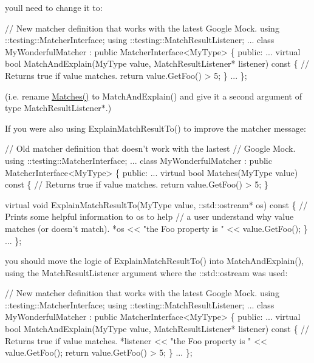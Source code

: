 you\textquotesingle{}ll need to change it to\+: 
\begin{DoxyCode}
// New matcher definition that works with the latest Google Mock.
using ::testing::MatcherInterface;
using ::testing::MatchResultListener;
...
class MyWonderfulMatcher : public MatcherInterface<MyType> \{
 public:
  ...
  virtual bool MatchAndExplain(MyType value,
                               MatchResultListener* listener) const \{
    // Returns true if value matches.
    return value.GetFoo() > 5;
  \}
  ...
\};
\end{DoxyCode}
 (i.\+e. rename {\ttfamily \hyperlink{namespacetesting_ad53b509ae9cd51040d67f668f99702ae}{Matches()}} to {\ttfamily Match\+And\+Explain()} and give it a second argument of type {\ttfamily Match\+Result\+Listener$\ast$}.)

If you were also using {\ttfamily Explain\+Match\+Result\+To()} to improve the matcher message\+: 
\begin{DoxyCode}
// Old matcher definition that doesn't work with the lastest
// Google Mock.
using ::testing::MatcherInterface;
...
class MyWonderfulMatcher : public MatcherInterface<MyType> \{
 public:
  ...
  virtual bool Matches(MyType value) const \{
    // Returns true if value matches.
    return value.GetFoo() > 5;
  \}

  virtual void ExplainMatchResultTo(MyType value,
                                    ::std::ostream* os) const \{
    // Prints some helpful information to os to help
    // a user understand why value matches (or doesn't match).
    *os << "the Foo property is " << value.GetFoo();
  \}
  ...
\};
\end{DoxyCode}


you should move the logic of {\ttfamily Explain\+Match\+Result\+To()} into {\ttfamily Match\+And\+Explain()}, using the {\ttfamily Match\+Result\+Listener} argument where the {\ttfamily \+::std\+::ostream} was used\+: 
\begin{DoxyCode}
// New matcher definition that works with the latest Google Mock.
using ::testing::MatcherInterface;
using ::testing::MatchResultListener;
...
class MyWonderfulMatcher : public MatcherInterface<MyType> \{
 public:
  ...
  virtual bool MatchAndExplain(MyType value,
                               MatchResultListener* listener) const \{
    // Returns true if value matches.
    *listener << "the Foo property is " << value.GetFoo();
    return value.GetFoo() > 5;
  \}
  ...
\};
\end{DoxyCode}


